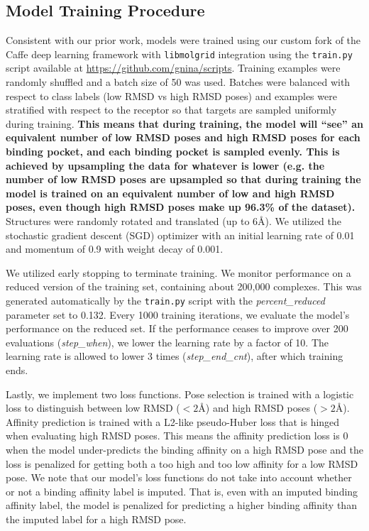 \documentclass[journal=jcim,manuscript=article]{achemso}
\begin{document}
\subsection{Model Training Procedure}
Consistent with our prior work\cite{crossdocked2020}, models were trained using our custom fork of the Caffe deep learning framework \cite{jia2014caffe} with \texttt{libmolgrid} integration \cite{sunseri2019libmolgrid} using the \texttt{train.py} script available at \url{https://github.com/gnina/scripts}.
Training examples were randomly shuffled and a batch size of 50 was used.
Batches were balanced with respect to class labels (low RMSD vs high RMSD poses) and examples were stratified with respect to the receptor so that targets are sampled uniformly during training.
\textbf{This means that during training, the model will ``see'' an equivalent number of low RMSD poses and high RMSD poses for each binding pocket, and each binding pocket is sampled evenly.
This is achieved by upsampling the data for whatever is lower (e.g. the number of low RMSD poses are upsampled so that during training the model is trained on an equivalent number of low and high RMSD poses, even though high RMSD poses make up 96.3\% of the dataset).}
Structures were randomly rotated and translated (up to 6{\AA}).
We utilized the stochastic gradient descent (SGD) optimizer with an initial learning rate of 0.01 and momentum of 0.9 with weight decay of 0.001.

We utilized early stopping to terminate training.
We monitor performance on a reduced version of the training set, containing about 200,000 complexes.
This was generated automatically by the \texttt{train.py} script with the \textit{percent\_reduced} parameter set to 0.132.
Every 1000 training iterations, we evaluate the model's performance on the reduced set.
If the performance ceases to improve over 200 evaluations (\textit{step\_when}), we lower the learning rate by a factor of 10.
The learning rate is allowed to lower 3 times (\textit{step\_end\_cnt}), after which training ends.

Lastly, we implement two loss functions.
Pose selection is trained with a logistic loss to distinguish between low RMSD ($<2${\AA}) and high RMSD poses ($>2${\AA}).
Affinity prediction is trained with a L2-like pseudo-Huber loss that is hinged when evaluating high RMSD poses.
This means the affinity prediction loss is 0 when the model under-predicts the binding affinity on a high RMSD pose and the loss is penalized for getting both a too high and too low affinity for a low RMSD pose.
We note that our model's loss functions do not take into account whether or not a binding affinity label is imputed.
That is, even with an imputed binding affinity label, the model is penalized for predicting a higher binding affinity than the imputed label for a high RMSD pose.
\end{document}
